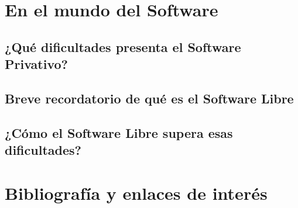 \documentclass[spanish]{beamer}
\begin{document}
\section{En el mundo del Software}
    \subsection{¿Qué dificultades presenta el \textbf{Software Privativo}?}
    \subsection{Breve recordatorio de qué es el \textbf{Software Libre}}
    \subsection{¿Cómo el \textbf{Software Libre} supera esas dificultades?}
\section{Bibliografía y enlaces de interés}
\end{document}
